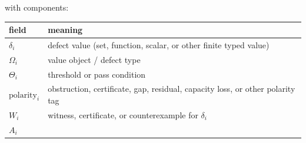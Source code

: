 \documentclass[11pt]{article}
\theoremstyle{definition}
\begin{document}
with components:

\begin{longtable}[]{@{}ll@{}}
\toprule
\begin{minipage}[b]{0.21\columnwidth}\raggedright
field\strut
\end{minipage} & \begin{minipage}[b]{0.73\columnwidth}\raggedright
meaning\strut
\end{minipage}\tabularnewline
\midrule
\endhead
\begin{minipage}[t]{0.21\columnwidth}\raggedright
\(\delta_{i}\)\strut
\end{minipage} & \begin{minipage}[t]{0.73\columnwidth}\raggedright
defect value (set, function, scalar, or other finite typed value)\strut
\end{minipage}\tabularnewline
\begin{minipage}[t]{0.21\columnwidth}\raggedright
\(\Omega_{i}\)\strut
\end{minipage} & \begin{minipage}[t]{0.73\columnwidth}\raggedright
value object / defect type\strut
\end{minipage}\tabularnewline
\begin{minipage}[t]{0.21\columnwidth}\raggedright
\(\Theta_{i}\)\strut
\end{minipage} & \begin{minipage}[t]{0.73\columnwidth}\raggedright
threshold or pass condition\strut
\end{minipage}\tabularnewline
\begin{minipage}[t]{0.21\columnwidth}\raggedright
\(\mathrm{polarity}_{i}\)\strut
\end{minipage} & \begin{minipage}[t]{0.73\columnwidth}\raggedright
obstruction, certificate, gap, residual, capacity loss, or other polarity tag\strut
\end{minipage}\tabularnewline
\begin{minipage}[t]{0.21\columnwidth}\raggedright
\(W_{i}\)\strut
\end{minipage} & \begin{minipage}[t]{0.73\columnwidth}\raggedright
witness, certificate, or counterexample for \(\delta_{i}\)\strut
\end{minipage}\tabularnewline
\begin{minipage}[t]{0.21\columnwidth}\raggedright
\(A_{i}\)\strut
\end{minipage} & \begin{minipage}[t]{0.73\columnwidth}\raggedright

\end{minipage}
\end{longtable}
\end{document}

